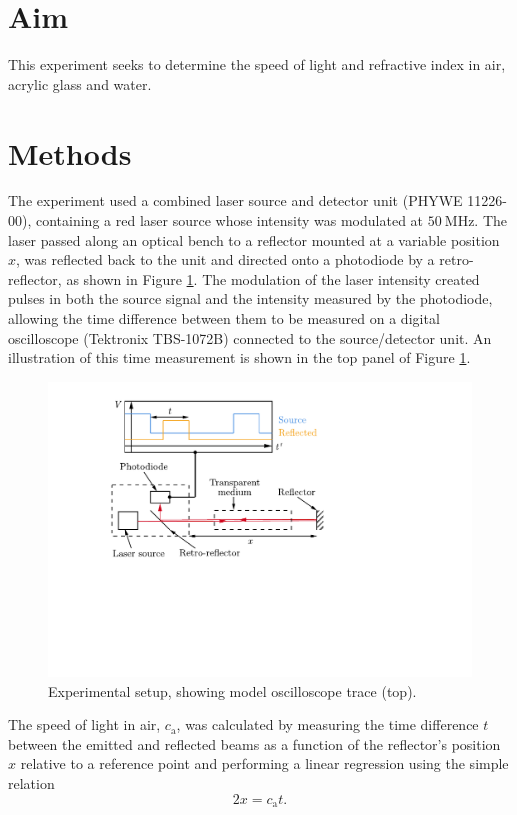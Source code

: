 \documentclass[
    aps,
    prl,
    reprint,
    10pt,
    amsmath,
    amssymb,
    a4paper,
    longbibliography
]{revtex4-2}
\begin{document}
\section{Aim}

This experiment seeks to determine the speed of light and refractive
index in air, acrylic glass and water.


\section{Methods}

The experiment used a combined laser source and detector unit (PHYWE
11226-00), containing a red laser source whose intensity was modulated
at $\SI{50}{\mega\hertz}$. The laser passed along an optical bench to
a reflector mounted at a variable position $x$, was reflected back to the unit
and directed onto a photodiode by a retro-reflector, as shown in Figure
\ref{setup}. The modulation of the laser intensity created pulses in both
the source signal and the intensity measured by the photodiode, allowing
the time difference between them to be measured on a digital
oscilloscope (Tektronix TBS-1072B) connected to the source/detector unit.
An illustration of this time measurement is shown in the top panel of
Figure \ref{setup}.

\begin{figure}[ht]
    \centering
    \includegraphics[width=\linewidth]{setup_updated}
    \caption{Experimental setup, showing model oscilloscope trace (top).}
    \label{setup}
\end{figure}

The speed of light in air, $c_\mathrm{a}$, was calculated by measuring
the time difference $t$ between the emitted and reflected beams as a
function of the reflector's position $x$ relative to a reference
point and performing a linear regression using the simple relation
\begin{equation}
    2x = c_\mathrm{a} t.
    \label{air_formula}
\end{equation}
\end{document}
